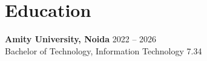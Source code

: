 \section*{Education}
\textbf{Amity University, Noida} \hfill 2022 -- 2026 \\
Bachelor of Technology, Information Technology \hfill 7.34